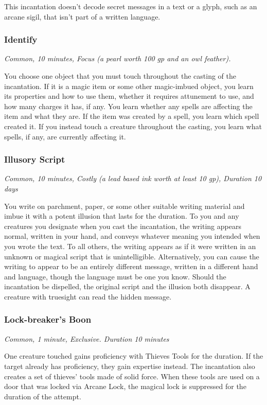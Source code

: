 This incantation doesn't decode secret messages in a text or a glyph, such as an arcane sigil, that isn't part of a written language.

\subsubsection{Identify}
\textit{Common, 10 minutes, Focus (a pearl worth 100 gp and an owl feather).}

You choose one object that you must touch throughout the casting of the incantation. If it is a magic item or some other magic-imbued object, you learn its properties and how to use them, whether it requires attunement to use, and how many charges it has, if any. You learn whether any spells are affecting the item and what they are. If the item was created by a spell, you learn which spell created it. If you instead touch a creature throughout the casting, you learn what spells, if any, are currently affecting it.

\subsubsection{Illusory Script}
\textit{Common, 10 minutes, Costly (a lead based ink worth at least 10 gp), Duration 10 days}

You write on parchment, paper, or some other suitable writing material and imbue it with a potent illusion that lasts for the duration. To you and any creatures you designate when you cast the incantation, the writing appears normal, written in your hand, and conveys whatever meaning you intended when you wrote the text. To all others, the writing appears as if it were written in an unknown or magical script that is unintelligible. Alternatively, you can cause the writing to appear to be an entirely different message, written in a different hand and language, though the language must be one you know. Should the incantation be dispelled, the original script and the illusion both disappear. A creature with truesight can read the hidden message.

\subsubsection{Lock-breaker's Boon}
\textit{Common, 1 minute, Exclusive. Duration 10 minutes}

One creature touched gains proficiency with Thieves Tools for the duration. If the target already has proficiency, they gain expertise instead. The incantation also creates a set of thieves' tools made of solid force. When these tools are used on a door that was locked via Arcane Lock, the magical lock is suppressed for the duration of the attempt.

